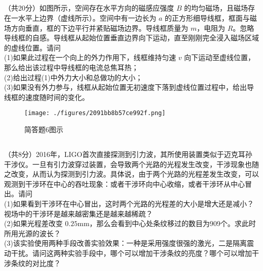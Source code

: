 \subsection{ }
（共20分）如图所示，空间存在水平方向的磁感应强度 $B$ 的均匀磁场，且磁场存在一水平上边界（虚线所示）。空间中有一边长为 $a$ 的正方形细导线框，框面与磁场方向垂直，框的下边平行并紧贴磁场边界。导线框质量为 $m$，电阻为 $R$。忽略导线框的自感。导线框从起始位置垂直边界向下运动，直至刚刚完全浸入磁场区域的虚线位置。请问\\
(1)如果此过程在一个向上的外力作用下，线框维持匀速 $v$ 向下运动至虚线位置，那么给出该过程中导线框的电流总焦耳热；\\
(2)给出过程(1)中外力大小和总做功的大小；\\
(3)如果没有外力参与，线框从起始位置无初速度下落到虚线位置过程中，给出导线框的速度随时间的变化。\\
\begin{figure}[ht]
\centering
\texttt{[image: ./figures/2091bb8b57ce992f.png]}
\caption{简答题6图示} \label{fig_CAS17_6}
\end{figure}

\subsection{ }
（共8分）2016年，LIGO首次直接探测到引力波，其所使用装置类似于迈克耳孙干涉仪。一旦有引力波穿过装置，会导致两个光路的光程发生改变，干涉现象也随之改变，从而认为探测到引力波。具体说，由于两个光路的光程差发生改变，可以观测到干涉环在中心的吞吐现象：或者干涉环向中心收缩，或者干涉环从中心冒出。请问\\
(1)如果看到干涉环在中心冒出，这时两个光路的光程差的大小是增大还是减小？视场中的干涉环是越来越密集还是越来越稀疏？\\
(2)如果光程差改变 $0.25\mathrm{mm}$，那么会看到中心处条纹移过的数目为909个。求此时所用光源的波长？\\
(3)该实验使用两种手段改善实验效果：一种是采用强度很强的激光，二是隔离震动干扰。请问这两种实验手段中，哪个可以增加干涉条纹的亮度？哪个可以增加干涉条纹的对比度？